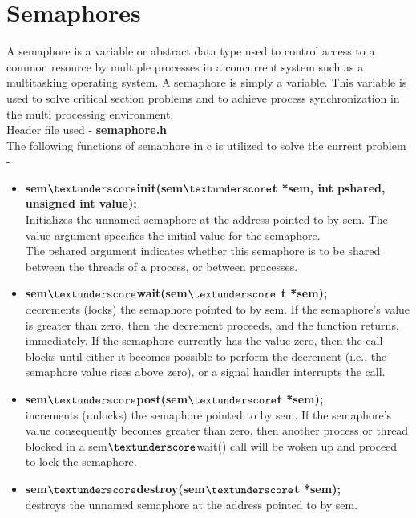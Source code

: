 \documentclass[12pt]{article}
\begin{document}
\section{Semaphores}
A semaphore is a variable or abstract data type used to control access to a common resource by multiple processes in a concurrent system such as a multitasking operating system. A semaphore is simply a variable. This variable is used to solve critical section problems and to achieve process synchronization in the multi processing environment.\\
Header file used - \textbf{semaphore.h}\\
The following functions of semaphore in c is  utilized to solve the current problem - 
\begin{itemize}
\item \textbf{sem$\textunderscore$init(sem$\textunderscore$t *sem, int pshared, unsigned int value);}\\
Initializes the unnamed semaphore at the address pointed
to by sem.  The value argument specifies the initial value for the
semaphore.\\
The pshared argument indicates whether this semaphore is to be shared
between the threads of a process, or between processes.
\item \textbf{sem$\textunderscore$wait(sem$\textunderscore$ t *sem);}\\
decrements (locks) the semaphore pointed to by sem.  If
the semaphore's value is greater than zero, then the decrement
proceeds, and the function returns, immediately.  If the semaphore
currently has the value zero, then the call blocks until either it
becomes possible to perform the decrement (i.e., the semaphore value
rises above zero), or a signal handler interrupts the call.
\item \textbf{sem$\textunderscore$post(sem$\textunderscore$t *sem);}\\
increments (unlocks) the semaphore pointed to by sem.  If
the semaphore's value consequently becomes greater than zero, then
another process or thread blocked in a sem$\textunderscore$wait() call will be woken
up and proceed to lock the semaphore.
\item \textbf{sem$\textunderscore$destroy(sem$\textunderscore$t *sem);}\\
destroys the unnamed semaphore at the address pointed to by sem.
\end{itemize}
\end{document}
